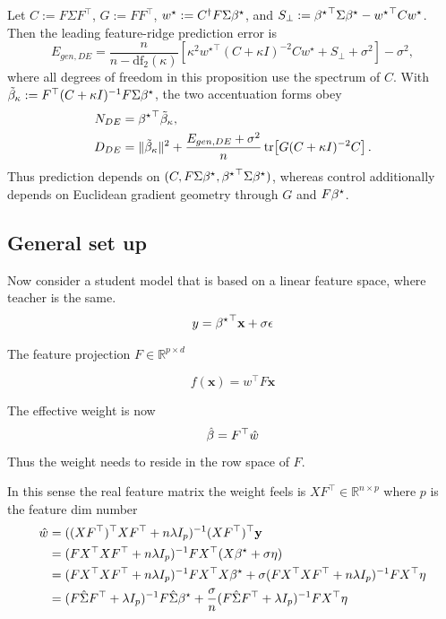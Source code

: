 \begingroup\color{red}
\begin{proposition}
\label{prop:app-feature-de}
Let $C:=F\Sigma F^\top$, $G:=FF^\top$,
$w^\star:=C^\dagger F\Sigma{\beta^{\star}}$, and
$S_\perp:={{\beta^{\star}}}^\top\Sigma{\beta^{\star}}-{w^\star}^\top Cw^\star$.
Then the leading feature-ridge prediction error is
\begin{equation}
E_{gen,DE}
=\frac{n}{n-\mathrm{df}_{2}(\kappa)}
\left[\kappa^2{w^\star}^\top(C+\kappa I)^{-2}Cw^\star
+S_\perp+\sigma^2\right]-\sigma^2,
\label{eq:app-feature-egen-summary}
\end{equation}
where all degrees of freedom in this proposition use the spectrum of $C$.
With
$\tilde\beta_\kappa:=F^\top(C+\kappa I)^{-1}F\Sigma{\beta^{\star}}$, the two
accentuation forms obey
\begin{align}
N_{DE}&={{\beta^{\star}}}^\top\tilde\beta_\kappa,\\
D_{DE}&=\|\tilde\beta_\kappa\|^2
+\frac{E_{gen,DE}+\sigma^2}{n}
\operatorname{tr}\!\left[G(C+\kappa I)^{-2}C\right].
\label{eq:app-feature-D-summary}
\end{align}
Thus prediction depends on $(C,F\Sigma{\beta^{\star}},{{\beta^{\star}}}^\top\Sigma{\beta^{\star}})$,
whereas control additionally depends on Euclidean gradient geometry through
$G$ and $F{\beta^{\star}}$.
\end{proposition}
\endgroup

\subsection{General set up}

Now consider a student model that is based on a linear feature space,
where teacher is the same.
\[
y={{\beta^{\star}}}^{\top}\mathbf{x}+\sigma\epsilon
\]

The feature projection $F\in\mathbb{R}^{p\times d}$

\[
f(\mathbf{x})=w^{\top}F\mathbf{x}
\]

The effective weight is now
\[
\hat{\beta}=F^{\top}\hat{w}
\]
 Thus the weight needs to reside in the row space of $F$.

In this sense the real feature matrix the weight feels is $XF^{\top}\in\mathbb{R}^{n\times p}$
where $p$ is the feature dim number
\begin{align*}
\hat{w} & =((XF^{\top})^{\top}XF^{\top}+n\lambda I_{p})^{-1}(XF^{\top})^{\top}\mathbf{y}\\
 & =(FX^{\top}XF^{\top}+n\lambda I_{p})^{-1}FX^{\top}(X{\beta^{\star}}+\sigma\eta)\\
 & =(FX^{\top}XF^{\top}+n\lambda I_{p})^{-1}FX^{\top}X{\beta^{\star}}+\sigma(FX^{\top}XF^{\top}+n\lambda I_{p})^{-1}FX^{\top}\eta\\
 & =(F\hat{\Sigma}F^{\top}+\lambda I_{p})^{-1}F\hat{\Sigma}{\beta^{\star}}+\frac{\sigma}{n}(F\hat{\Sigma}F^{\top}+\lambda I_{p})^{-1}FX^{\top}\eta
\end{align*}

